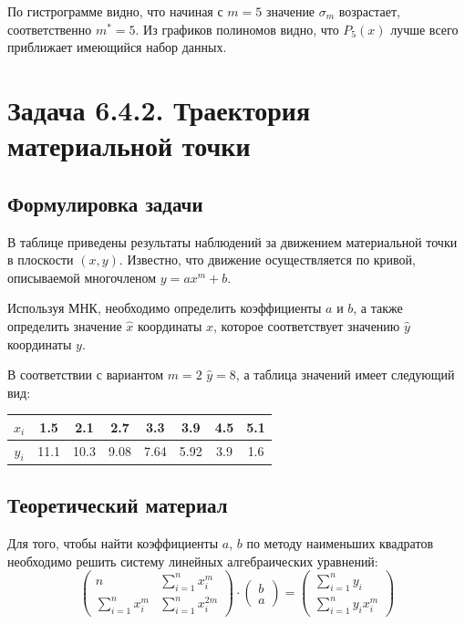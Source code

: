 \documentclass[12pt]{article}%
\begin{document}
По гистрограмме видно, что начиная с $m = 5$ значение $\sigma_m$ возрастает, соответственно $m^*=5$. Из графиков полиномов видно, что $P_5(x)$ лучше всего приближает имеющийся набор данных.



\newpage
\section{Задача 6.4.2. Траектория материальной точки}
\subsection{Формулировка задачи}
В таблице приведены результаты наблюдений за движением материальной точки в плоскости $(x, y)$. Известно, что движение осуществляется по кривой, описываемой многочленом $y = ax^m + b$. 

Используя МНК, необходимо определить коэффициенты $a$ и $b$, а также определить значение $\hat{x}$ координаты $x$, которое соответствует значению $\hat{y}$ координаты $y$. 

В соответствии с вариантом $m=2$ $\hat{y} = 8$, а таблица значений имеет следующий вид:
\begin{table}[h]
\centering
\hspace{0.1cm}
\begin{tabular}{|c|c|c|c|c|c|c|c|}
\hline
$x_i$ & 1.5 & 2.1 & 2.7 & 3.3 & 3.9 & 4.5 & 5.1  \\
\hline
$y_i$ & 11.1 & 10.3 & 9.08 & 7.64 & 5.92 & 3.9 & 1.6 \\
\hline
\end{tabular}
\end{table}

\subsection{Теоретический материал}
Для того, чтобы найти коэффициенты $a$, $b$ по методу наименьших квадратов необходимо решить систему линейных алгебраических уравнений:
\[
\begin{pmatrix}
    n & \sum\limits_{i=1}^n x_i^m \\
    \sum\limits_{i=1}^n x_i^m & \sum\limits_{i=1}^n x_i^{2m}
\end{pmatrix} \cdot \begin{pmatrix}
    b \\
    a
\end{pmatrix} = \begin{pmatrix}
    \sum\limits_{i=1}^n y_i \\
    \sum\limits_{i=1}^n y_i x_i^m
\end{pmatrix} 
\]
\end{document}

